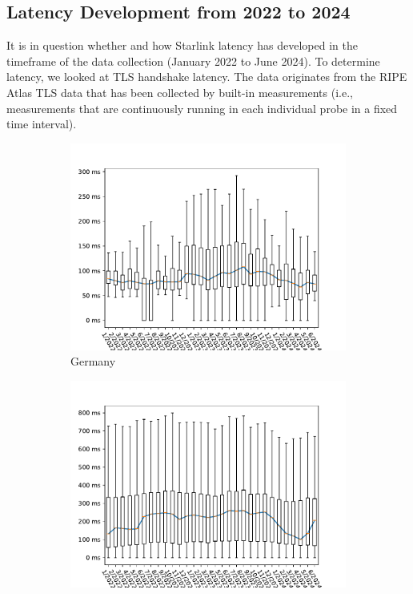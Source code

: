 \subsection{Latency Development from 2022 to 2024} \label{sec:latency-wholerange}

It is in question whether and how Starlink latency has developed in the
timeframe of the data collection (January 2022 to June 2024). To determine
latency, we looked at TLS handshake latency. The data originates from the RIPE
Atlas TLS data that has been collected by built-in measurements (i.e.,
measurements that are continuously running in each individual probe in a fixed
time interval).

\begin{figure}
	\centering
	\begin{subfigure}[b]{0.47\linewidth}
		\includegraphics[width=\linewidth]{chapters/4-results/latency/img/latency_2022_to_2024_Germany.pdf}
		\caption{Germany}
	\end{subfigure}
	\begin{subfigure}[b]{0.47\linewidth}
		\includegraphics[width=\linewidth]{chapters/4-results/latency/img/latency_2022_to_2024_United States.pdf}

\end{subfigure}
\end{figure}
